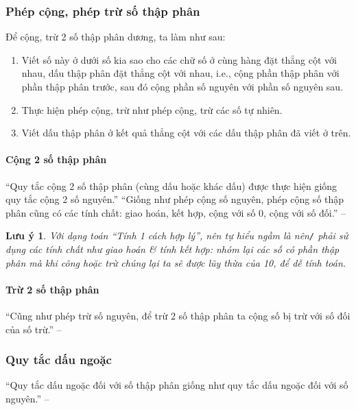 \documentclass{article}
\numberwithin{equation}{section}
\newtheorem{luuy}{Lưu ý}[section]
\begin{document}
\subsubsection{Phép cộng, phép trừ số thập phân}
Để cộng, trừ 2 số thập phân dương, ta làm như sau:
\begin{enumerate}
	\item Viết số này ở dưới số kia sao cho các chữ số ở cùng hàng đặt thẳng cột với nhau, dấu thập phân đặt thẳng cột với nhau, i.e., cộng phần thập phân với phần thập phân trước, sau đó cộng phần số nguyên với phần số nguyên sau.
	\item Thực hiện phép cộng, trừ như phép cộng, trừ các số tự nhiên.
	\item Viết dấu thập phân ở kết quả thẳng cột với các dấu thập phân đã viết ở trên.
\end{enumerate}

\paragraph{Cộng 2 số thập phân}
``Quy tắc cộng 2 số thập phân (cùng dấu hoặc khác dấu) được thực hiện giống quy tắc cộng 2 số nguyên.'' ``Giống như phép cộng số nguyên, phép cộng số thập phân cũng có các tính chất: giao hoán, kết hợp, cộng với số 0, cộng với số đối.'' -- \cite[p. 49]{SGK_Toan_6_Canh_Dieu_tap_2}

\begin{luuy}
	Với dạng toán ``Tính 1 cách hợp lý'', nên tự hiểu ngầm là nên\emph{\texttt{/}} phải sử dụng các tính chất như giao hoán \textit{\&} tính kết hợp: nhóm lại các số có phần thập phân mà khi công hoặc trừ chúng lại ta sẽ được lũy thừa của 10, để dễ tính toán.
\end{luuy}

\paragraph{Trừ 2 số thập phân}
``Cũng như phép trừ số nguyên, để trừ 2 số thập phân ta cộng số bị trừ với số đối của số trừ.'' -- \cite[p. 50]{SGK_Toan_6_Canh_Dieu_tap_2}

\subsubsection{Quy tắc dấu ngoặc}
``Quy tắc dấu ngoặc đối với số thập phân giống như quy tắc dấu ngoặc đối với số nguyên.'' -- \cite[p. 50]{SGK_Toan_6_Canh_Dieu_tap_2}

\end{document}

